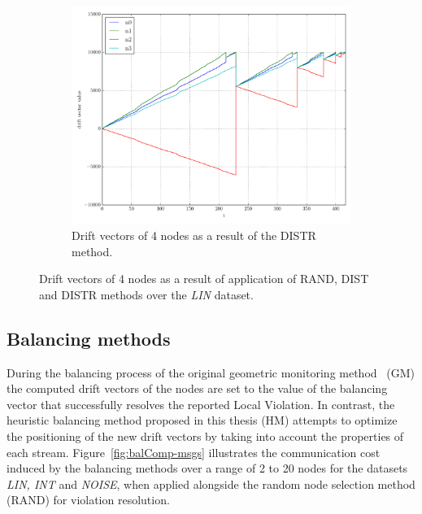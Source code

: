 \begin{figure}[!htb]
\begin{subfigure}{0.32\textwidth}%
  \includegraphics[width=\linewidth]{img/matchings_classic_distroptpair_drifts.pdf}
  \caption{Drift vectors of 4 nodes as a result of the DISTR method.}
\end{subfigure}
\vspace{0.5cm}
\caption{Drift vectors of 4 nodes as a result of application of RAND, DIST and DISTR methods over the \emph{LIN} dataset.} \label{fig:matchingComp-drifts}
\end{figure}

\subsection{Balancing methods} \label{subsec:balComp}

During the balancing process of the original geometric monitoring method~\cite{Sharfman2006GM} (GM) the computed drift vectors of the nodes are set to the value of the balancing vector that successfully resolves the reported Local Violation. In contrast, the heuristic balancing method proposed in this thesis (HM) attempts to optimize the positioning of the new drift vectors by taking into account the properties of each stream. Figure~\ref{fig:balComp-msgs} illustrates the communication cost induced by the balancing methods over a range of 2 to 20 nodes for the datasets \emph{LIN, INT} and \emph{NOISE}, when applied alongside the random node selection method (RAND) for violation resolution.

